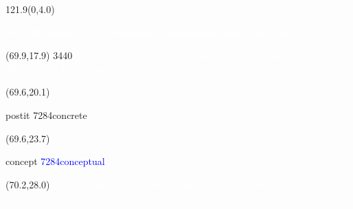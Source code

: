 \documentclass{beamer}
\makeatletter
\newcommand\HUGE{\@setfontsize\Huge{72}{84}}
\newcommand\HUGEB{\@setfontsize\Huge{108}{120}}
\newcommand\Larger{\@setfontsize\Large{34}{40}}
\newcommand\mywt[1]{\textcolor{white}{#1}}
\makeatother
\begin{document}
\begin{textblock}{121.9}(0,4.0)
  \begin{center}
    \mywt{\HUGEB{\bfseries{Modern C++ Containers, Algorithms and Concepts}}}
    \end{center}
\end{textblock}

\begin{textblock}{50.5}(69.9,17.9)
  \Larger{\mywt{\emph{``The standard library saves programmers from having to reinvent the wheel.''}\hspace*{2cm} -- Bjarne Stroustrup}}
\end{textblock}

\begin{textblock}{16.7}(69.6,20.1)
    \begin{beamercolorbox}[center,rounded=true,sep=5mm,ht=3cm,wd=16.7cm]{postit}
      \textcolor{purpleth}{\HUGE{concrete}}
      \vspace*{2mm}
    \end{beamercolorbox}
\end{textblock}

\begin{textblock}{16.7}(69.6,23.7)
    \begin{beamercolorbox}[center,rounded=true,sep=5mm,wd=16.7cm]{concept}
      \textcolor{blue}{\HUGE{conceptual}}
    \end{beamercolorbox}
\end{textblock}

\begin{textblock}{16}(70.2,28.0)
  \Large{\mywt{Organization and content thanks to the C++17 standard and cppreference.com}}
\end{textblock}
\end{document}
